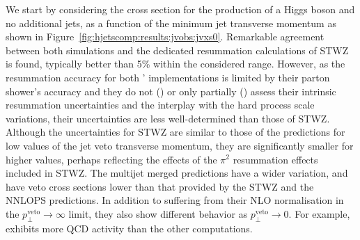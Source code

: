 We start by considering 
the cross section for the production of a Higgs boson and no 
additional jets, as a function of the minimum jet transverse momentum 
as shown in Figure~\ref{fig:hjetscomp:results:jvobs:jvxs0}. Remarkable 
agreement between both \NNLOPS simulations and the dedicated resummation 
calculations of STWZ is found, typically better than 5\% within the considered range. 
However, as the resummation accuracy for both \NNLOPS' implementations is limited by their parton 
shower's accuracy and they do not (\Powheg) or only partially (\Sherpa) 
assess their intrinsic resummation uncertainties and the interplay with the hard process 
scale variations, their uncertainties are less well-determined than those of STWZ. Although
the uncertainties for STWZ are similar to those of the \NNLOPS predictions for low values of the
jet veto transverse momentum, they are significantly smaller for higher values, perhaps reflecting the
effects of the $\pi^2$ resummation effects included in STWZ.
 The multijet merged predictions have a wider variation, and have veto cross sections lower than
that provided by the STWZ and the NNLOPS predictions. In addition to 
suffering from their NLO normalisation in the $p_\perp^\text{veto}\to\infty$ 
limit, they also show different behavior as $p_\perp^\text{veto}\to 0$. For example, 
\Sherpa \MEPSatNLO exhibits more QCD activity than the other computations. 

